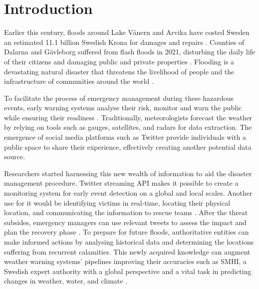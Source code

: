 \chapter{Introduction}\label{sec:introduction}

Earlier this century, floods around Lake Vänern and Arvika have costed Sweden an estimated 11.1
billion Swedish Krona for damages and repairs \cite{RiverFloodsSweden2022}. Counties of Dalarna and
Gävleborg suffered from flash floods in 2021, disturbing the daily life of their citizens and
damaging public and private properties \cite{daviesSwedenFlashFloods2021}. Flooding is a devastating
natural disaster that threatens the livelihood of people and the infrastructure of communities
around the world \cite{Floodlist2021}.

To facilitate the process of emergency management during these hazardous events, early warning
systems analyse their risk, monitor and warn the public while ensuring their readiness
\cite{contributorsEarlyWarningSystem2022}. Traditionally, meteorologists forecast the weather by
relying on tools such as gauges, satellites, and radars for data extraction. The emergence of social
media platforms such as Twitter provide individuals with a public space to share their experience,
effectively creating another potential data source.

Researchers started harnessing this new wealth of information to aid the disaster management
procedure. Twitter streaming \ac{API} makes it possible to create a monitoring system for early
event detection on a global \cite{debruijnGlobalDatabaseHistoric2019b} and local
\cite{barkerDevelopmentNationalscaleRealtime2019} scales. Another use for it would be identifying
victims in real-time, locating their physical location, and communicating the information to rescue
teams \cite{singhEventClassificationLocation2019}. After the threat subsides, emergency managers can
use relevant tweets to assess the impact and plan the recovery phase
\cite{barkerDevelopmentNationalscaleRealtime2019}. To prepare for future floods, authoritative
entities can make informed actions by analysing historical data and determining the locations
suffering from recurrent calamities. This newly acquired knowledge can augment weather warning
systems' pipelines improving their accuracies such as \ac{SMHI}, a Swedish expert authority with a
global perspective and a vital task in predicting changes in weather, water, and climate
\cite{SMHI2021}.

